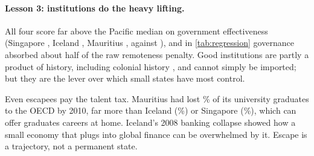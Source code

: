 \paragraph{Lesson 3: institutions do the heavy lifting.} All four score far
above the Pacific median on government effectiveness (Singapore \govSingapore,
Iceland \govIceland, Mauritius \govMauritius, against \govPacificMedian{}),
and in \cref{tab:regression} governance absorbed about half of the raw
remoteness penalty. Good institutions are partly a product of history,
including colonial history \parencite{acemoglu2001}, and cannot simply be
imported; but they are the lever over which small states have most control.

\begin{counterpoint}
Even escapees pay the talent tax. Mauritius had lost \emigMauritius\% of
its university graduates to the OECD by 2010, far more than Iceland
(\emigIceland\%) or Singapore (\emigSingapore\%), which can offer graduates
careers at home. Iceland's 2008 banking collapse showed how a small economy that
plugs into global finance can be overwhelmed by it. Escape is a trajectory,
not a permanent state.
\end{counterpoint}

